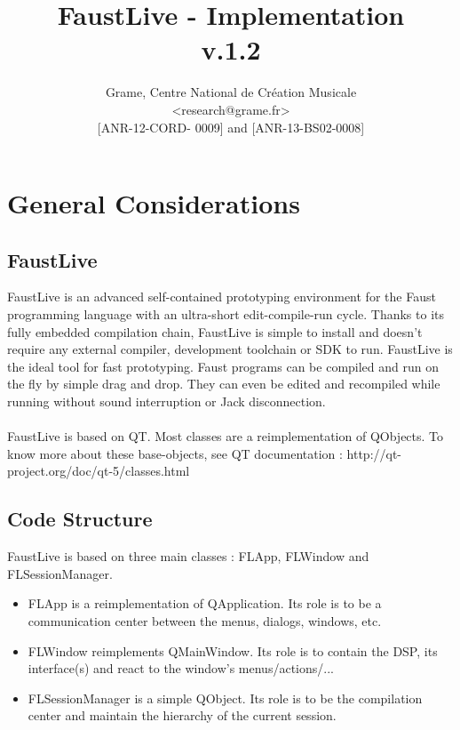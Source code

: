 \documentclass[a4paper]{article}
\begin{document}
\title{FaustLive - Implementation \\ v.1.2}

\author{Grame, Centre National de Création Musicale\\
{\small <research@grame.fr>} \\
\vspace{2mm}
[ANR-12-CORD- 0009] and [ANR-13-BS02-0008]
}

\maketitle


\newpage
\tableofcontents

\newpage
\section{General Considerations}

\subsection{FaustLive}
FaustLive is an advanced self-contained prototyping environment for the Faust programming language with an ultra-short edit-compile-run cycle. Thanks to its fully embedded compilation chain, FaustLive is simple to install and doesn't require any external compiler, development toolchain or SDK to run. FaustLive is the ideal tool for fast prototyping. Faust programs can be compiled and run on the fly by simple drag and drop. They can even be edited and recompiled while running without sound interruption or Jack disconnection. \\
\\
FaustLive is based on QT. Most classes are a reimplementation of QObjects. 
To know more about these base-objects, see QT documentation : http://qt-project.org/doc/qt-5/classes.html

\subsection{Code Structure}

FaustLive is based on three main classes : FLApp, FLWindow and FLSessionManager.

\begin{itemize}
\item FLApp is a reimplementation of QApplication. Its role is to be a communication center between the menus, dialogs, windows, etc. 

\item FLWindow reimplements QMainWindow. Its role is to contain the DSP, its interface(s) and react to the window's menus/actions/...

\item FLSessionManager is a simple QObject. Its role is to be the compilation center and maintain the hierarchy of the current session. 

\end{itemize}
\end{document}
